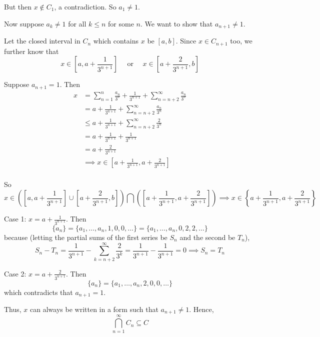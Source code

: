 \documentclass[12pt]{article}
\newcommand{\sub}{\subseteq}
\begin{document}
\begin{itemize}
            But then $x \not\in C_1$, a contradiction. So $a_1 \neq 1$.

            Now suppose $a_k \neq 1$ for all $k \leq n$ for some $n$. We want to show that $a_{n + 1} \neq 1$. 
            
            Let the closed interval in $C_n$ which contains $x$ be $[a, b]$. Since $x \in C_{n+1}$ too, we further know that 
            \[x \in [a, a + \frac{1}{3^{n+1}}] \quad \text{ or }\quad  x \in [a + \frac{2}{3^{n+1}}, b]\]

            Suppose $a_{n+1} = 1$. Then 
            \begin{align*}
                x &= \sum_{n=1}^n \frac{a_n}{3^n} + \frac{1}{3^{n+1}} + \sum_{n=n+2}^{\infty} \frac{a_n}{3^n}\\
                    &= a + \frac{1}{3^{n+1}} + \sum_{n=n+2}^{\infty} \frac{a_n}{3^n}\\
                    &\leq a + \frac{1}{3^{n+1}} + \sum_{n=n+2}^{\infty} \frac{2}{3^n}\\
                    &= a + \frac{1}{3^{n+1}} + \frac{1}{3^{n+1}}\\
                    &= a + \frac{2}{3^{n+1}}\\ 
                    &\implies x \in [a + \frac{1}{3^{n+1}}, a + \frac{2}{3^{n+1}}]\\ 
            \end{align*}

            So 
            \[x \in \left([a, a + \frac{1}{3^{n+1}}] \cup [a + \frac{2}{3^{n+1}}, b]\right) \bigcap \left([a + \frac{1}{3^{n+1}}, a + \frac{2}{3^{n+1}}]\right) \implies x \in \left\{a + \frac{1}{3^{n+1}}, a + \frac{2}{3^{n+1}}\right\} \]

            Case 1: $x = a + \frac{1}{3^{n+1}}$. Then
            \[\{a_n\} = \{a_1, \dots, a_n, 1, 0, 0, \dots\} = \{a_1, \dots, a_n, 0, 2, 2, \dots\}\]
            because (letting the partial sums of the first series be $S_n$ and the second be $T_n$),
            \[S_n - T_n = \frac{1}{3^{n+1}} - \sum_{k=n+2}^{\infty} \frac{2}{3^k} = \frac{1}{3^{n+1}} - \frac{1}{3^{n+1}} = 0 \implies S_n = T_n\] 

            Case 2: $x = a + \frac{2}{3^{n+1}}$. Then 
            \[\{a_n\} = \{a_1, \dots, a_n, 2, 0, 0, \dots\}\] 
            which contradicts that $a_{n+1} = 1$. 

            Thus, $x$ can always be written in a form such that $a_{n+1} \neq 1$. Hence, 
            \[\bigcap_{n=1}^{\infty} C_n \sub C\] 


\end{itemize}
\end{document}
